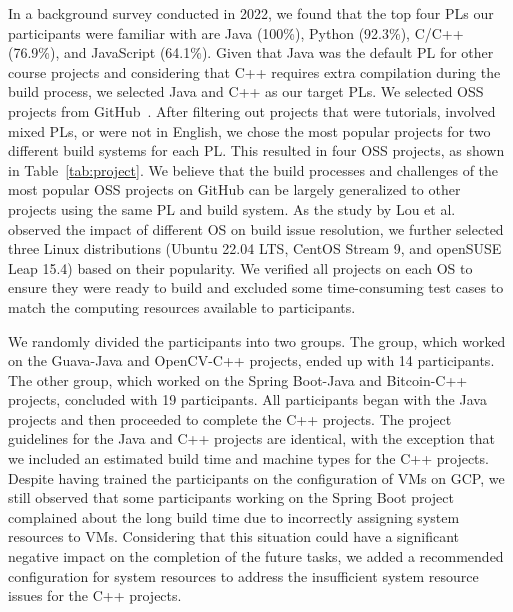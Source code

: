 \documentclass[10pt, conference]{IEEEtran}
\begin{document}
In a background survey conducted in 2022, we found that the top four PLs our participants were familiar with are Java (100\%), Python (92.3\%), C/C++ (76.9\%), and JavaScript (64.1\%). Given that Java was the default PL for other course projects and considering that C++ requires extra compilation during the build process, we selected Java and C++ as our target PLs. We selected OSS projects from GitHub~\cite{github}. After filtering out projects that were tutorials, involved mixed PLs, or were not in English, we chose the most popular projects for two different build systems for each PL. This resulted in four OSS projects, as shown in Table~\ref{tab:project}. We believe that the build processes and challenges of the most popular OSS projects on GitHub can be largely generalized to other projects using the same PL and build system. As the study by Lou et al.~\cite{lou2020understanding} observed the impact of different OS on build issue resolution, we further selected three Linux distributions (Ubuntu 22.04 LTS, CentOS Stream 9, and openSUSE Leap 15.4) based on their popularity. We verified all projects on each OS to ensure they were ready to build and excluded some time-consuming test cases to match the computing resources available to participants. 

We randomly divided the participants into two groups. The group, which worked on the Guava-Java and OpenCV-C++ projects, ended up with 14 participants. The other group, which worked on the Spring Boot-Java and Bitcoin-C++ projects, concluded with 19 participants. All participants began with the Java projects and then proceeded to complete the C++ projects. The project guidelines for the Java and C++ projects are identical, with the exception that we included an estimated build time and machine types for the C++ projects. Despite having trained the participants on the configuration of VMs on GCP, we still observed that some participants working on the Spring Boot project complained about the long build time due to incorrectly assigning system resources to VMs. Considering that this situation could have a significant negative impact on the completion of the future tasks, we added a recommended configuration for system resources to address the insufficient system resource issues for the C++ projects.
\end{document}
